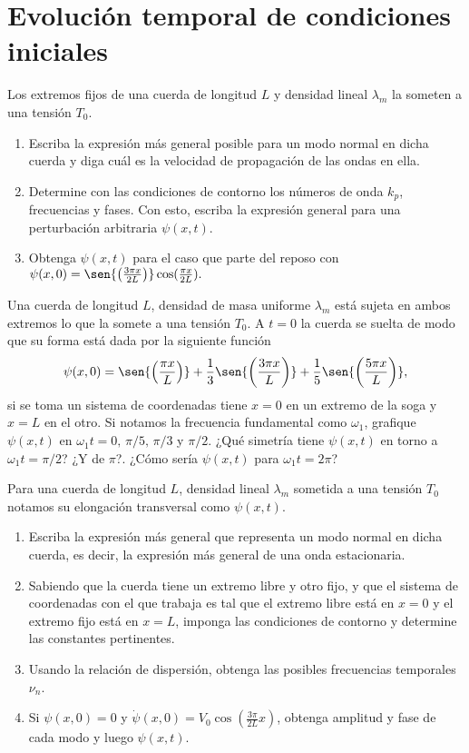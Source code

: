 \section*{Evolución temporal de condiciones iniciales}

\item Los extremos fijos de una cuerda de longitud $L$ y densidad lineal $\lambda_m$ la someten a una tensión $T_0$.
\begin{enumerate}
	\item Escriba la expresión más general posible para un modo normal en dicha cuerda y diga cuál es la velocidad de propagación de las ondas en ella.
	\item Determine con las condiciones de contorno los números de onda $k_p$, frecuencias y fases.
	Con esto, escriba la expresión general para una perturbación arbitraria $\psi(x,t)$.
	\item Obtenga $\psi(x,t)$ para el caso que parte del reposo con
	$
	\psi(x,0) = \sen{\left( \frac{3\pi x}{2L} \right)} \cos( \frac{\pi x}{2L} ).
	$
\end{enumerate}


\item Una cuerda de longitud $L$, densidad de masa uniforme $\lambda_m$ está sujeta en ambos extremos lo que la somete a una tensión $T_{0}$.
A $t=0$ la cuerda se suelta de modo que su forma está dada por la siguiente función
$$
\psi(x,0) = \sen{ \left(\frac{\pi x}{L} \right) } + \frac{1}{3} \sen{ \left( \frac{3\pi x}{L} \right) } + \frac{1}{5} \sen{ \left( \frac{5\pi x}{L} \right) },
$$
si se toma un sistema de coordenadas tiene $x=0$ en un extremo de la soga y $x = L$ en el otro. 
	Si notamos la frecuencia fundamental como $\omega_{1}$, grafique $\psi(x,t)$ en $\omega_1 t = 0,\,\pi/5,\,\pi/3$ y $\pi/2$.
	¿Qué simetría tiene $\psi(x,t)$ en torno a $\omega_1 t = \pi/2$?
	¿Y de $\pi$?.
	¿Cómo sería $\psi(x,t)$ para $\omega_1 t = 2 \pi$?


\item Para una cuerda de longitud $L$, densidad lineal $\lambda_m$ sometida a una tensión $T_0$ notamos su elongación transversal como $\psi(x,t)$.
\begin{enumerate}
	\item Escriba la expresión más general que representa un modo normal en
dicha cuerda, es decir, la expresión más general de una onda estacionaria.
	\item Sabiendo que la cuerda tiene un extremo libre y otro fijo, y que el
sistema de coordenadas con el que trabaja es tal que el extremo libre
está en $x=0$ y el extremo fijo está en $x=L$, imponga las condiciones
de contorno y determine las constantes pertinentes.
	\item Usando la relación de dispersión, obtenga las posibles frecuencias
temporales $\nu_{n}$. 
	\item Si $\psi(x,0)=0$ y $\dot{\psi}(x,0)=V_{0}\cos\left(\frac{3\pi}{2L}x\right)$, obtenga amplitud y fase de cada modo y luego $\psi(x,t)$.
\end{enumerate}


